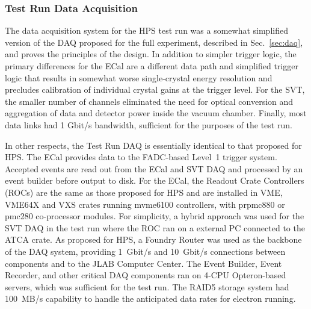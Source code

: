 
\subsubsection{Test Run Data Acquisition}
\label{sec:testrun_daq}


The data acquisition system for the HPS test run was a somewhat simplified version of the DAQ proposed for the
full experiment, described in Sec.~\ref{sec:daq}, and proves the principles of the design.  In addition to simpler trigger logic,
the primary differences for the ECal are a different data path and simplified trigger logic that results in somewhat worse
single-crystal energy resolution and precludes calibration of individual crystal gains at the trigger level.  For the SVT, the smaller
number of channels eliminated the need for optical conversion and aggregation of data and detector power inside the vacuum chamber.
Finally, most data links had 1 Gbit/s bandwidth, sufficient for the purposes of the test run.

In other respects, the Test Run DAQ is essentially identical to that proposed for HPS.  The ECal provides data to the FADC-based Level~1
trigger system. Accepted events are read out from the ECal and SVT DAQ and processed by an event builder before output to disk.
For the ECal, the Readout Crate Controllers (ROCs) are the same as those proposed for HPS and are installed in VME, VME64X and VXS 
crates running mvme6100 controllers, with prpmc880 or pmc280 co-processor modules. For simplicity, a hybrid approach was 
used for the SVT DAQ in the test run where the ROC ran on a external PC connected to the ATCA crate. As proposed for HPS, a 
Foundry Router was used as the backbone of the DAQ system, providing 1~Gbit/s and 10~Gbit/s connections between components 
and to the JLAB Computer Center. The Event Builder, Event Recorder, and other critical DAQ components ran on 4-CPU Opteron-based servers, 
which was sufficient for the test run. The RAID5 storage system had 100~MB/s capability to handle the anticipated data rates for electron running.



